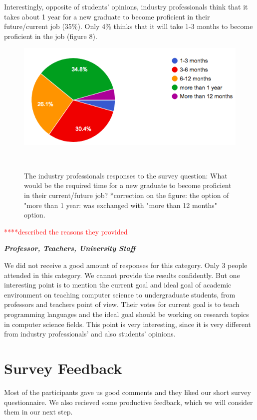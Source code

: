 \documentclass{sigchi}
\begin{document}
Interestingly, opposite of students' opinions, industry professionals think that it takes about 1 year for a new graduate to become proficient in their future/current job (35\%). Only 4\% thinks that it will take 1-3 months to become proficient in the job (figure 8).

\begin{figure}
\centering
  \includegraphics[width=1.05\columnwidth]{figures/time_proficiency_i}
  \caption{The industry professionals responses to the survey question: What would be the required time for a new graduate to become proficient in their current/future job? *correction on the figure: the option of "more than 1 year: was exchanged with "more than 12 months" option.}~\label{fig:figure8}
\end{figure}


\textcolor{red}{****described the reasons they provided}


\textit{\textbf{Professor, Teachers, University Staff}}

We did not receive a good amount of responses for this category. Only 3 people attended in this category. We cannot provide the results confidently. But one interesting point is to mention the current goal and ideal goal of academic environment on teaching computer science to undergraduate students, from professors and teachers point of view. Their votes for current goal is to teach programming languages and the ideal goal should be working on research topics in computer science fields. This point is very interesting, since it is very different from industry professionals' and also students' opinions.

\section{Survey Feedback}
Most of the participants gave us good comments and they liked our short survey questionnaire. We also recieved some productive feedback, which we will consider them in our next step.
\end{document}
